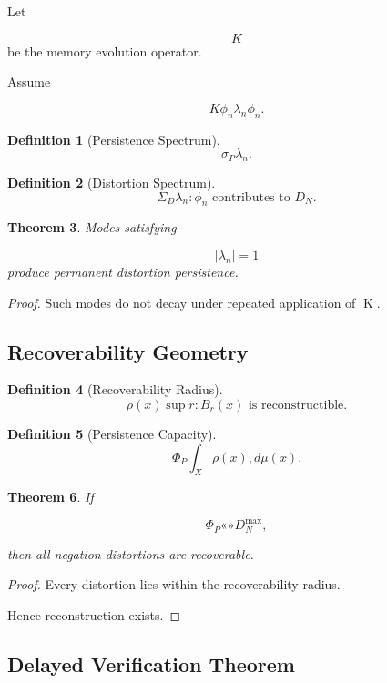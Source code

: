 \documentclass[12pt]{article}
\newtheorem{theorem}{Theorem}[section]
\newtheorem{definition}[theorem]{Definition}
\theoremstyle{remark}
\begin{document}
Let

\[
K
\]
be the memory evolution operator.

Assume

\[
K\phi_n
\lambda_n\phi_n.
\]

\begin{definition}[Persistence Spectrum]
\[
\sigma_P
{\lambda_n}.
\]
\end{definition}

\begin{definition}[Distortion Spectrum]
\[
\Sigma_D
{
\lambda_n:
\phi_n
\text{ contributes to }
D_N
}.
\]
\end{definition}

\begin{theorem}
Modes satisfying

\[
|\lambda_n|=1
\]
produce permanent distortion persistence.
\end{theorem}

\begin{proof}
Such modes do not decay under repeated application of K.
\end{proof}

\subsection{Recoverability Geometry}

\begin{definition}[Recoverability Radius]
\[
\rho(x)
\sup
{
r:
B_r(x)
\text{ is reconstructible}
}.
\]
\end{definition}

\begin{definition}[Persistence Capacity]
\[
\Phi_P
\int_X
\rho(x)
,d\mu(x).
\]
\end{definition}

\begin{theorem}
If

\[
\Phi_P
«»

D_N^{\max},
\]

then all negation distortions are recoverable.
\end{theorem}

\begin{proof}
Every distortion lies within the recoverability radius.

Hence reconstruction exists.
\end{proof}

\subsection{Delayed Verification Theorem}
\end{document}
